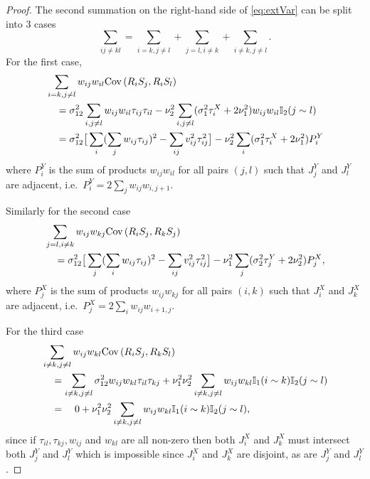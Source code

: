 \begin{proof}
The second summation on the right-hand side of \eqref{eq:extVar} can be split into 3 cases
$$
\sum_{ij \neq kl} = \sum_{i=k,j \neq l} + \sum_{j=l,i \neq k} + \sum_{i \neq k, j \neq l}. $$
For the first case,
\begin{align}\label{eq:firstcase}
&\sum_{i=k,j \neq l} w_{ij} w_{il} \text{\rm Cov}\,(R_i S_j,R_i S_l) \notag \\ 
&\quad = \sigma^2_{12}\sum_{i,j \neq l} w_{ij} w_{il} \tau_{ij} \tau_{il} - \nu_2^2\sum_{i,j \neq l} (\sigma_1^2 \tau_i^X + 2\nu_1^2) w_{ij} w_{il}  \mathbb{I}_2(j \sim l) \notag \\
&\quad= \sigma^2_{12}\big[\sum_i(\sum_j w_{ij} \tau_{ij})^2  - \sum_{ij} v^2_{ij} \tau^2_{ij}\big] - \nu_2^2\sum_i (\sigma_1^2 \tau_i^X + 2\nu_1^2) P_i^Y 
\end{align}
where $P^Y_i$ is the sum of products $w_{ij}w_{il}$ for all pairs $(j,l)$ such that $J_j^Y$ and $J_l^Y$ are adjacent, i.e.\ 
$P_i^Y =  2\sum_j w_{ij} w_{i,j+1}.$

Similarly for the second case 
\begin{align}\label{eq:secondcase}
&\sum_{j=l,i \neq k} w_{ij} w_{kj} \text{\rm Cov}\,(R_i S_j,R_k S_j) \notag \\ 
&\quad=  \sigma^2_{12}\big[\sum_j(\sum_i w_{ij} \tau_{ij})^2  - \sum_{ij} v^2_{ij} \tau^2_{ij}\big] - \nu_1^2\sum_j (\sigma_2^2 \tau_j^Y + 2\nu_2^2) P_j^X, 
\end{align}
where $P^X_j$ is the sum of products $w_{ij}w_{kj}$ for all pairs $(i,k)$ such that $J_i^X$ and $J_k^X$ are adjacent, i.e.\ 
$P_j^X =  2\sum_i w_{ij} w_{i+1,j}.$

For the third case 
\begin{align}\label{eq:Allneighbours}
&\sum_{i \neq k, j \neq l} w_{ij} w_{kl} \text{\rm Cov}\,(R_i S_j,R_k S_l) \notag \\ 
&\quad= \sum_{i \neq k, j \neq l} \sigma^2_{12} w_{ij} w_{kl} \tau_{il} \tau_{kj} + \nu_1^2 \nu_2^2 \sum_{i \neq k, j \neq l}w_{ij} w_{kl}\mathbb{I}_1(i \sim k) \mathbb{I}_2(j\sim l) \notag \\
&\quad= \quad 0 + \nu_1^2 \nu_2^2 \sum_{i \neq k, j \neq l}w_{ij} w_{kl}\mathbb{I}_1(i \sim k) \mathbb{I}_2(j\sim l),
\end{align}
since if $\tau_{il},\tau_{kj},w_{ij}$ and $w_{kl}$ are all non-zero then both $J^X_i$ and $J^X_k$ must intersect both $J^Y_j$ and $J^Y_l$ which is impossible since $J^X_i$ and $J^X_k$ are disjoint, as are $J^Y_j$ and $J^Y_l$. 


\end{proof}
